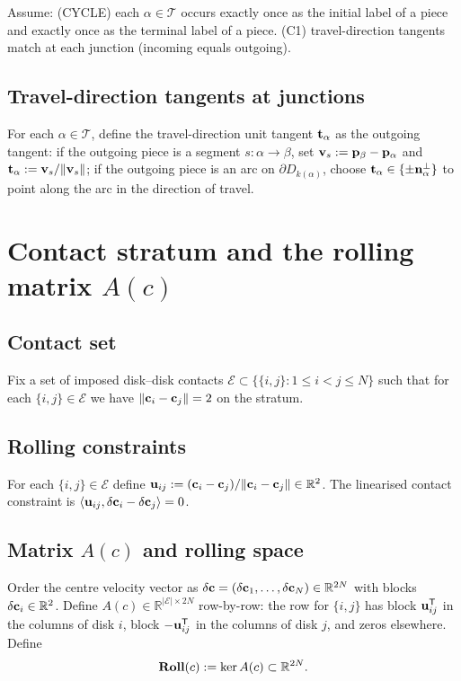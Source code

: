 \documentclass[12pt,letterpaper]{amsart}
\theoremstyle{definition}
\theoremstyle{remark}
\newcommand{\Roll}{\text{\rm \bf Roll}}
\newcommand{\R}{{\mathbb{R}}}
\begin{document}
Assume:
(CYCLE) each $\alpha\in\mathcal T$ occurs exactly once as the initial label of a piece and exactly once as the terminal label of a piece.
(C1) travel-direction tangents match at each junction (incoming equals outgoing).

\subsection{Travel-direction tangents at junctions}

For each $\alpha\in\mathcal T$, define the travel-direction unit tangent ${\bf t}_\alpha$ as the outgoing tangent:
if the outgoing piece is a segment $s:\alpha\to\beta$, set ${\bf v}_s:={\bf p}_\beta-{\bf p}_\alpha$ and ${\bf t}_\alpha:={\bf v}_s/\|{\bf v}_s\|$;
if the outgoing piece is an arc on $\partial D_{k(\alpha)}$, choose ${\bf t}_\alpha\in\{\pm {\bf n}_\alpha^\perp\}$ to point along the arc in the direction of travel.

\section{Contact stratum and the rolling matrix $A(c)$}

\subsection{Contact set}

Fix a set of imposed disk--disk contacts $\mathcal E\subset\{\{i,j\}:1\le i<j\le N\}$ such that for each $\{i,j\}\in\mathcal E$ we have $\|{\bf c}_i-{\bf c}_j\|=2$ on the stratum.

\subsection{Rolling constraints}

For each $\{i,j\}\in\mathcal E$ define ${\bf u}_{ij}:=({\bf c}_i-{\bf c}_j)/\|{\bf c}_i-{\bf c}_j\|\in\R^2$.
The linearised contact constraint is $\langle {\bf u}_{ij},\delta{\bf c}_i-\delta{\bf c}_j\rangle=0$.

\subsection{Matrix $A(c)$ and rolling space}

Order the centre velocity vector as $\delta{\bf c}=(\delta{\bf c}_1,\dots,\delta{\bf c}_N)\in\R^{2N}$ with blocks $\delta{\bf c}_i\in\R^2$.
Define $A(c)\in\R^{|\mathcal E|\times 2N}$ row-by-row:
the row for $\{i,j\}$ has block ${\bf u}_{ij}^\mathsf T$ in the columns of disk $i$, block $-{\bf u}_{ij}^\mathsf T$ in the columns of disk $j$, and zeros elsewhere.
Define
\[
\Roll(c):=\ker A(c)\subset\R^{2N}.
\]
\end{document}

